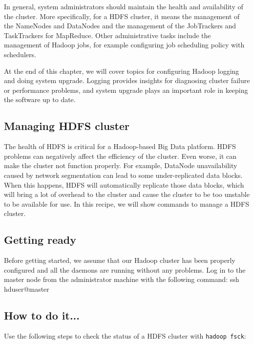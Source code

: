 In general, system administrators should maintain the health and availability of the cluster. More specifically, for a HDFS cluster, it means the management of the NameNodes and DataNodes and the management of the JobTrackers and TaskTrackers for MapReduce. Other administrative tasks include the management of Hadoop jobs, for example configuring job scheduling policy with schedulers.

At the end of this chapter, we will cover topics for configuring Hadoop logging and doing system upgrade. Logging provides insights for diagnosing cluster failure or performance problems, and system upgrade plays an important role in keeping the software up to date.

\subsection*{Managing HDFS cluster}
The health of HDFS is critical for a Hadoop-based Big Data platform. HDFS problems can negatively affect the efficiency of the cluster. Even worse, it can make the cluster not function properly. For example, DataNode unavailability caused by network segmentation can lead to some under-replicated data blocks. When this happens, HDFS will automatically replicate those data blocks, which will bring a lot of overhead to the cluster and cause the cluster to be too unstable to be available for use. In this recipe, we will show commands to manage a HDFS cluster.
\subsection*{Getting ready}
Before getting started, we assume that our Hadoop cluster has been properly configured and all the daemons are running without any problems.
Log in to the master node from the administrator machine with the following command:
ssh hduser@master
\subsection*{How to do it...}
Use the following steps to check the status of a HDFS cluster with \verb|hadoop fsck|:

